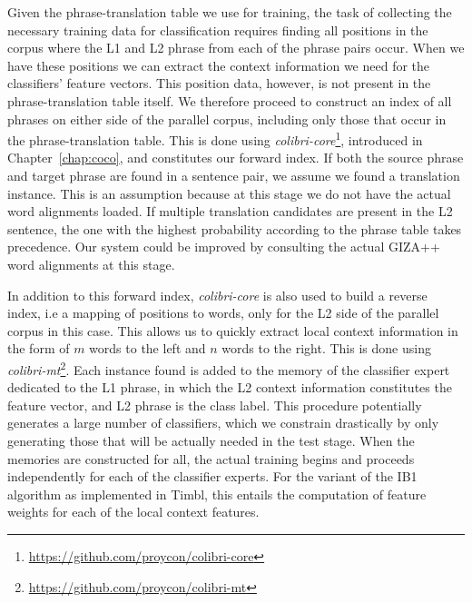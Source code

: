 Given the phrase-translation table we use for training, the task of collecting
the necessary training data for classification requires finding all positions
in the corpus where the L1 and L2 phrase from each of the phrase pairs occur.
When we have these positions we can extract the context information we need for
the classifiers' feature vectors.  This position data, however, is not present
in the phrase-translation table itself.  We therefore proceed to construct an
index of all phrases on either side of the parallel corpus, including only
those that occur in the phrase-translation table. This is done using
\emph{colibri-core}\footnote{\url{https://github.com/proycon/colibri-core}},
introduced in Chapter~\ref{chap:coco}, and constitutes our forward index. 
If both the source phrase and target phrase are found in a sentence pair, we
assume we found a translation instance. This is an assumption because at this
stage we do not have the actual word alignments loaded. If multiple translation
candidates are present in the L2 sentence, the one with the highest probability
according to the phrase table takes precedence. Our system could be improved by
consulting the actual GIZA++ word alignments at this stage.

In addition to this forward index, \emph{colibri-core} is also used to build a reverse
index, i.e a mapping of positions to words, only for the L2 side of the parallel
corpus in this case. This allows us to quickly extract local context
information in the form of $m$ words to the left and $n$ words to the right.
This is done using \emph{colibri-mt}\footnote{\url{https://github.com/proycon/colibri-mt}}.
Each instance found is added to the memory of the classifier expert dedicated
to the L1 phrase, in which the L2 context information constitutes the feature
vector, and L2 phrase is the class label. This procedure potentially generates a large
number of classifiers, which we constrain drastically by only generating those
that will be actually needed in the test stage.
When the memories are constructed for all, the actual
training begins and proceeds independently for each of the classifier experts.
For the variant of the IB1 algorithm as implemented in Timbl, this entails the computation of
feature weights for each of the local context features.




